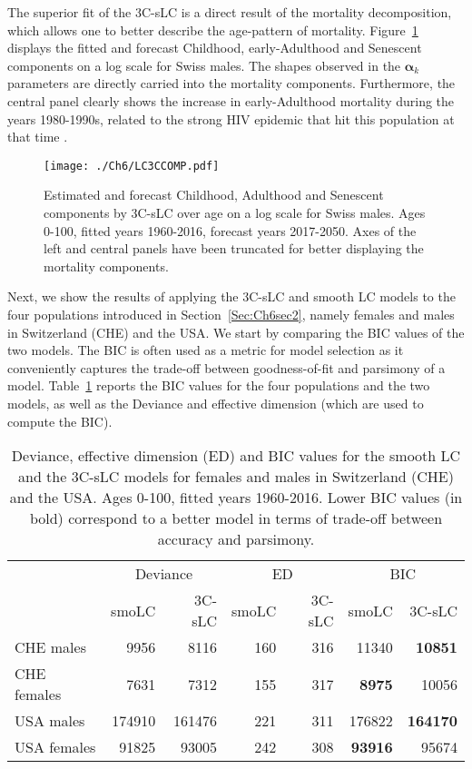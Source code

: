 \documentclass[Thesis]{subfiles}
\begin{document}
The superior fit of the 3C-sLC is a direct result of the mortality decomposition, which allows one to better describe the age-pattern of mortality. Figure~\ref{fig:3CLCcomp} displays the fitted and forecast Childhood, early-Adulthood and Senescent components on a log scale for Swiss males. The shapes observed in the $\bm{\alpha}_k$ parameters are directly carried into the mortality components. Furthermore, the central panel clearly shows the increase in early-Adulthood mortality during the years 1980-1990s, related to the strong HIV epidemic that hit this population at that time \citep{csete2012switzerland}.

\begin{figure}[!ht]\centering
	\texttt{[image: ./Ch6/LC3CCOMP.pdf]}
	\caption{\label{fig:3CLCcomp} Estimated and forecast Childhood, Adulthood and Senescent components by 3C-sLC over age on a log scale for Swiss males. Ages 0-100, fitted years 1960-2016, forecast years 2017-2050. Axes of the left and central panels have been truncated for better displaying the mortality components.}  
\end{figure}

Next, we show the results of applying the 3C-sLC and smooth LC models to the four populations introduced in Section~\ref{Sec:Ch6sec2}, namely females and males in Switzerland (CHE) and the USA. We start by comparing the BIC values of the two models. The BIC is often used as a metric for model selection as it conveniently captures the trade-off between goodness-of-fit and parsimony of a model. Table~\ref{table:Ch6BIC} reports the BIC values for the four populations and the two models, as well as the Deviance and effective dimension (which are used to compute the BIC).  

\begin{table}[!ht]\centering
	\begin{tabular}{@{}l|rr|rr|rr@{}}
		& \multicolumn{2}{c|}{Deviance} & \multicolumn{2}{c|}{ED} & \multicolumn{2}{c}{BIC} \\ 
		& smoLC       & 3C-sLC     & smoLC      & 3C-sLC     & smoLC      & 3C-sLC     \\ \midrule
		CHE males   & 9956        & 8116       & 160        & 316        & 11340     & \textbf{10851}      \\
		\rowcolor[HTML]{EFEFEF} 
		CHE females $\;$ & 7631        & 7312       & 155       & 317        & \textbf{8975}       & 10056      \\
		USA males   & 174910      & 161476     & 221       & 311        & 176822     & \textbf{164170}     \\
		\rowcolor[HTML]{EFEFEF} 
		USA females & 91825       & 93005      & 242       & 308       & \textbf{93916}      & 95674      \\ \bottomrule
	\end{tabular}
	\caption{\label{table:Ch6BIC}Deviance, effective dimension (ED) and BIC values for the smooth LC and the 3C-sLC models for females and males in Switzerland (CHE) and the USA. Ages 0-100, fitted years 1960-2016. Lower BIC values (in bold) correspond to a  better model in terms of trade-off between accuracy and parsimony.} 
\end{table}
\end{document}
